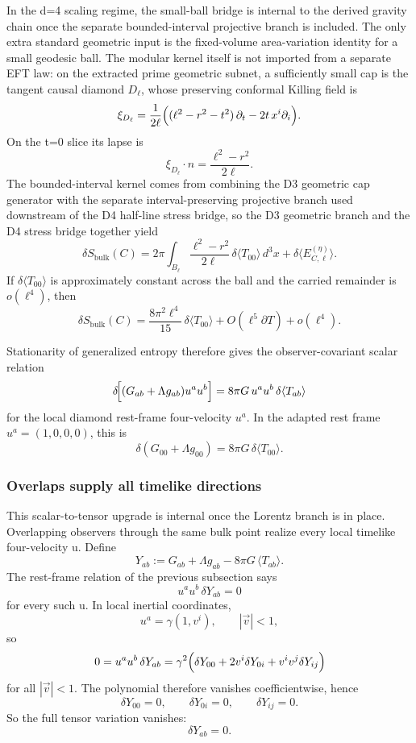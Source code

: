 In the d=4 scaling regime, the small-ball bridge is internal to the derived gravity chain once the separate bounded-interval projective branch is included. The only extra standard geometric input is the fixed-volume area-variation identity for a small geodesic ball. The modular kernel itself is not imported from a separate EFT law: on the extracted prime geometric subnet, a sufficiently small cap is the tangent causal diamond \(D_\ell\), whose preserving conformal Killing field is
\[
\xi_{D_\ell}
=
\frac{1}{2\ell}
\Bigl((\ell^2-r^2-t^2)\,\partial_t-2t\,x^i\partial_i\Bigr).
\]
On the t=0 slice its lapse is
\[
\xi_{D_\ell}\!\cdot n=\frac{\ell^2-r^2}{2\ell}.
\]
The bounded-interval kernel comes from combining the D3 geometric cap generator with the separate interval-preserving projective branch used downstream of the D4 half-line stress bridge, so the D3 geometric branch and the D4 stress bridge together yield
\[
\delta S_{\mathrm{bulk}}(C)
=
2\pi\int_{B_\ell}\frac{\ell^2-r^2}{2\ell}\,\delta\langle T_{00}\rangle\,d^3x
+
\delta\langle E^{(\eta)}_{C,\ell}\rangle.
\]
If \(\delta\langle T_{00}\rangle\) is approximately constant across the ball and the carried remainder is \(o(\ell^4)\), then
\[
\delta S_{\mathrm{bulk}}(C)
=
\frac{8\pi^2\ell^4}{15}\,\delta\langle T_{00}\rangle
+O(\ell^5\partial T)+o(\ell^4).
\]

Stationarity of generalized entropy therefore gives the observer-covariant scalar relation
\[
\delta\!\Bigl[(G_{ab}+\Lambda g_{ab})u^a u^b\Bigr]
=
8\pi G\,u^a u^b\,\delta\langle T_{ab}\rangle
\]
for the local diamond rest-frame four-velocity \(u^a\). In the adapted rest frame \(u^a=(1,0,0,0)\), this is
\[
\delta\!\left(G_{00}+\Lambda g_{00}\right)=8\pi G\,\delta\langle T_{00}\rangle.
\]

\subsubsection{Overlaps supply all timelike directions}\label{57-overlaps-supply-all-timelike-directions}

This scalar-to-tensor upgrade is internal once the Lorentz branch is in place. Overlapping observers through the same bulk point realize every local timelike four-velocity u. Define
\[
Y_{ab}:=G_{ab}+\Lambda g_{ab}-8\pi G\,\langle T_{ab}\rangle.
\]
The rest-frame relation of the previous subsection says
\[
u^a u^b\,\delta Y_{ab}=0
\]
for every such u. In local inertial coordinates,
\[
u^a=\gamma(1,v^i),
\qquad
|\vec v|<1,
\]
so
\[
0
=
u^a u^b\,\delta Y_{ab}
=
\gamma^2\Bigl(\delta Y_{00}+2v^i\delta Y_{0i}+v^iv^j\delta Y_{ij}\Bigr)
\]
for all \(|\vec v|<1\). The polynomial therefore vanishes coefficientwise, hence
\[
\delta Y_{00}=0,\qquad
\delta Y_{0i}=0,\qquad
\delta Y_{ij}=0.
\]
So the full tensor variation vanishes:
\[
\delta Y_{ab}=0.
\]

